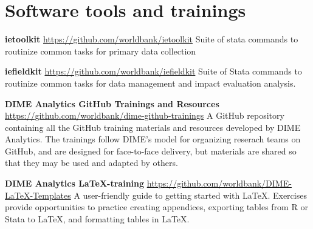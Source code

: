 \filbreak
\section{Software tools and trainings}
\vspace{\baselineskip}

\textbf{ietoolkit} 
\url{https://github.com/worldbank/ietoolkit}
Suite of stata commands to routinize common tasks for primary data collection

\textbf{iefieldkit} 
\url{https://github.com/worldbank/iefieldkit}
Suite of Stata commands to routinize common tasks for data management and impact evaluation analysis. 

\textbf{DIME Analytics GitHub Trainings and Resources}
\url{https://github.com/worldbank/dime-github-trainings}
A GitHub repository containing all the GitHub training materials and resources developed by DIME Analytics. The trainings follow DIME's model for organizing reserach teams on GitHub, and are designed for face-to-face delivery, but materials are shared so that they may be used and adapted by others. 

\textbf{DIME Analytics \LaTeX-training}
\url{https://github.com/worldbank/DIME-LaTeX-Templates}
A user-friendly guide to getting started with LaTeX. Exercises provide opportunities to practice creating appendices, exporting tables from R or Stata to LaTeX, and formatting tables in LaTeX. 




\mainmatter

